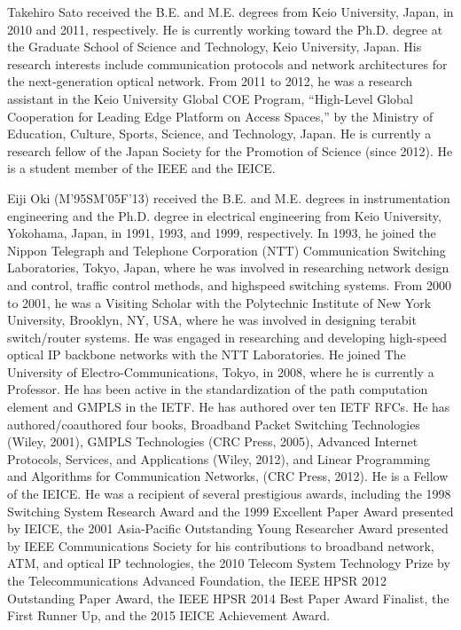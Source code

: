 \documentclass{ieeeaccess}
\begin{document}
\begin{IEEEbiography}{Takehiro Sato} received the B.E. and M.E. degrees from Keio
University, Japan, in 2010 and 2011, respectively. He is currently
working toward the Ph.D. degree at the Graduate School of Science
and Technology, Keio University, Japan. His research interests include
communication protocols and network architectures for the
next-generation optical network. From 2011 to 2012, he was a research
assistant in the Keio University Global COE Program,
``High-Level Global Cooperation for Leading Edge Platform on
Access Spaces,” by the Ministry of Education, Culture, Sports,
Science, and Technology, Japan. He is currently a research fellow
of the Japan Society for the Promotion of Science (since 2012). He is
a student member of the IEEE and the IEICE.
\end{IEEEbiography}


\begin{IEEEbiography}{Eiji Oki} (M'95SM'05F'13) received the B.E. and
M.E. degrees in instrumentation engineering and the
Ph.D. degree in electrical engineering from Keio
University, Yokohama, Japan, in 1991, 1993, and
1999, respectively. In 1993, he joined the Nippon
Telegraph and Telephone Corporation (NTT) Communication
Switching Laboratories, Tokyo, Japan,
where he was involved in researching network
design and control, traffic control methods, and highspeed
switching systems. From 2000 to 2001, he
was a Visiting Scholar with the Polytechnic Institute
of New York University, Brooklyn, NY, USA, where he was involved in
designing terabit switch/router systems. He was engaged in researching
and developing high-speed optical IP backbone networks with the NTT
Laboratories. He joined The University of Electro-Communications, Tokyo,
in 2008, where he is currently a Professor. He has been active in the
standardization of the path computation element and GMPLS in the IETF.
He has authored over ten IETF RFCs. He has authored/coauthored four
books, Broadband Packet Switching Technologies (Wiley, 2001), GMPLS
Technologies (CRC Press, 2005), Advanced Internet Protocols, Services, and
Applications (Wiley, 2012), and Linear Programming and Algorithms for
Communication Networks, (CRC Press, 2012). He is a Fellow of the IEICE.
He was a recipient of several prestigious awards, including the 1998 Switching
System Research Award and the 1999 Excellent Paper Award presented by
IEICE, the 2001 Asia-Pacific Outstanding Young Researcher Award presented
by IEEE Communications Society for his contributions to broadband network,
ATM, and optical IP technologies, the 2010 Telecom System Technology
Prize by the Telecommunications Advanced Foundation, the IEEE HPSR 2012
Outstanding Paper Award, the IEEE HPSR 2014 Best Paper Award Finalist,
the First Runner Up, and the 2015 IEICE Achievement Award.
\end{IEEEbiography}



\EOD
\end{document}
